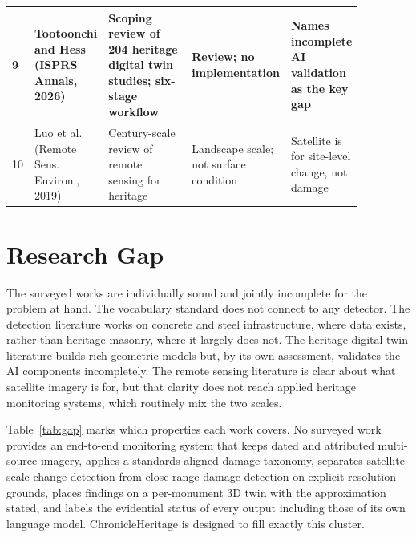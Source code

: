 \documentclass[a4paper,12pt,oneside]{book}
\begin{document}
{\begin{longtable}{|p{0.04\linewidth}|p{0.19\linewidth}|p{0.26\linewidth}|p{0.21\linewidth}|p{0.17\linewidth}|}
9 & Tootoonchi and Hess \cite{tootoonchi2026dt} (ISPRS Annals, 2026) & Scoping review of 204 heritage digital twin studies; six-stage workflow & Review; no implementation & Names incomplete AI validation as the key gap \\ \hline
10 & Luo et al. \cite{luo2019remote} (Remote Sens. Environ., 2019) & Century-scale review of remote sensing for heritage & Landscape scale; not surface condition & Satellite is for site-level change, not damage \\ \hline
\end{longtable}
}

\section{Research Gap}
The surveyed works are individually sound and jointly incomplete for the problem at hand. The vocabulary standard \cite{icomos2008glossary} does not connect to any detector. The detection literature \cite{cha2017deep, dorafshan2018sdnet, farronato2026cif} works on concrete and steel infrastructure, where data exists, rather than heritage masonry, where it largely does not. The heritage digital twin literature \cite{gil2024hbim, tootoonchi2026dt, banfi2026hbim} builds rich geometric models but, by its own assessment, validates the AI components incompletely. The remote sensing literature \cite{luo2019remote, tapete2017sar} is clear about what satellite imagery is for, but that clarity does not reach applied heritage monitoring systems, which routinely mix the two scales.

Table~\ref{tab:gap} marks which properties each work covers. No surveyed work provides an end-to-end monitoring system that keeps dated and attributed multi-source imagery, applies a standards-aligned damage taxonomy, separates satellite-scale change detection from close-range damage detection on explicit resolution grounds, places findings on a per-monument 3D twin with the approximation stated, and labels the evidential status of every output including those of its own language model. ChronicleHeritage is designed to fill exactly this cluster.
\end{document}
